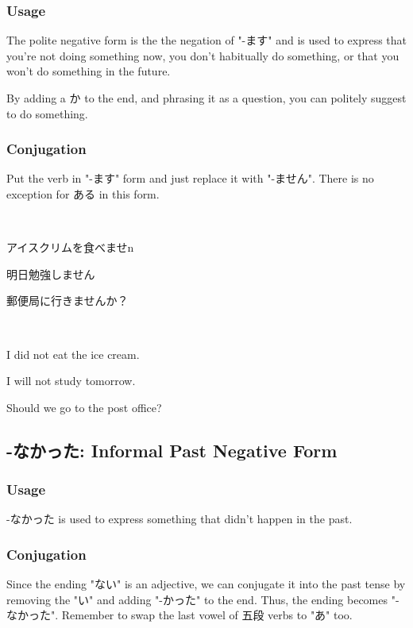 \documentclass{article}
\begin{document}
\begin{CJK}{UTF8}{min}
\subsubsection{Usage}

The polite negative form is the the negation of "-ます" and is used to express that you're not doing something now, you don't habitually do something, or that you won't do something in the future.

By adding a か to the end, and phrasing it as a question, you can politely suggest to do something.

\subsubsection{Conjugation}

Put the verb in "-ます" form and just replace it with "-ません". There is no exception for ある in this form.

\begin{example}
    \ 

アイスクリムを食べませn

明日勉強しません

郵便局に行きませんか？
\end{example}

\begin{solution}
\ 

I did not eat the ice cream.

I will not study tomorrow.

Should we go to the post office?
\end{solution}

\subsection{-なかった: Informal Past Negative Form}

\subsubsection{Usage}

-なかった is used to express something that didn't happen in the past.

\subsubsection{Conjugation}

Since the ending "ない" is an adjective, we can conjugate it into the past tense by removing the "い" and adding "-かった" to the end. Thus, the ending becomes "-なかった". Remember to swap the last vowel of 五段 verbs to "あ" too.


\end{CJK}
\end{document}
